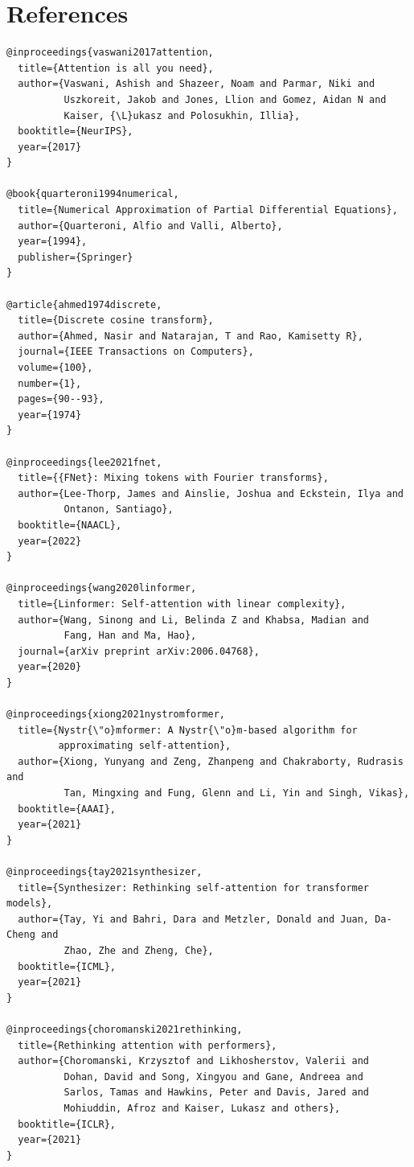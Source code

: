 
\section{References}

\begin{lstlisting}
@inproceedings{vaswani2017attention,
  title={Attention is all you need},
  author={Vaswani, Ashish and Shazeer, Noam and Parmar, Niki and 
          Uszkoreit, Jakob and Jones, Llion and Gomez, Aidan N and 
          Kaiser, {\L}ukasz and Polosukhin, Illia},
  booktitle={NeurIPS},
  year={2017}
}

@book{quarteroni1994numerical,
  title={Numerical Approximation of Partial Differential Equations},
  author={Quarteroni, Alfio and Valli, Alberto},
  year={1994},
  publisher={Springer}
}

@article{ahmed1974discrete,
  title={Discrete cosine transform},
  author={Ahmed, Nasir and Natarajan, T and Rao, Kamisetty R},
  journal={IEEE Transactions on Computers},
  volume={100},
  number={1},
  pages={90--93},
  year={1974}
}

@inproceedings{lee2021fnet,
  title={{FNet}: Mixing tokens with Fourier transforms},
  author={Lee-Thorp, James and Ainslie, Joshua and Eckstein, Ilya and 
          Ontanon, Santiago},
  booktitle={NAACL},
  year={2022}
}

@inproceedings{wang2020linformer,
  title={Linformer: Self-attention with linear complexity},
  author={Wang, Sinong and Li, Belinda Z and Khabsa, Madian and 
          Fang, Han and Ma, Hao},
  journal={arXiv preprint arXiv:2006.04768},
  year={2020}
}

@inproceedings{xiong2021nystromformer,
  title={Nystr{\"o}mformer: A Nystr{\"o}m-based algorithm for 
         approximating self-attention},
  author={Xiong, Yunyang and Zeng, Zhanpeng and Chakraborty, Rudrasis and 
          Tan, Mingxing and Fung, Glenn and Li, Yin and Singh, Vikas},
  booktitle={AAAI},
  year={2021}
}

@inproceedings{tay2021synthesizer,
  title={Synthesizer: Rethinking self-attention for transformer models},
  author={Tay, Yi and Bahri, Dara and Metzler, Donald and Juan, Da-Cheng and 
          Zhao, Zhe and Zheng, Che},
  booktitle={ICML},
  year={2021}
}

@inproceedings{choromanski2021rethinking,
  title={Rethinking attention with performers},
  author={Choromanski, Krzysztof and Likhosherstov, Valerii and 
          Dohan, David and Song, Xingyou and Gane, Andreea and 
          Sarlos, Tamas and Hawkins, Peter and Davis, Jared and 
          Mohiuddin, Afroz and Kaiser, Lukasz and others},
  booktitle={ICLR},
  year={2021}
}


\end{lstlisting}

